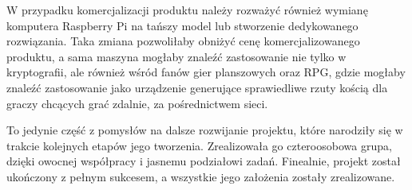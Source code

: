 W przypadku komercjalizacji produktu należy rozważyć również wymianę komputera Raspberry Pi na tańszy model lub stworzenie dedykowanego rozwiązania.
Taka zmiana pozwoliłaby obniżyć cenę komercjalizowanego produktu, a sama maszyna mogłaby znaleźć zastosowanie nie tylko w kryptografii,
ale również wśród fanów gier planszowych oraz RPG, gdzie mogłaby znaleźć zastosowanie jako urządzenie generujące sprawiedliwe rzuty kością
dla graczy chcących grać zdalnie, za pośrednictwem sieci.

To jedynie część z pomysłów na dalsze rozwijanie projektu, które narodziły się w trakcie kolejnych etapów jego tworzenia.
Zrealizowała go czteroosobowa grupa, dzięki owocnej współpracy i jasnemu podziałowi zadań. 
Finealnie, projekt został ukończony z pełnym sukcesem, a wszystkie jego założenia zostały zrealizowane. 